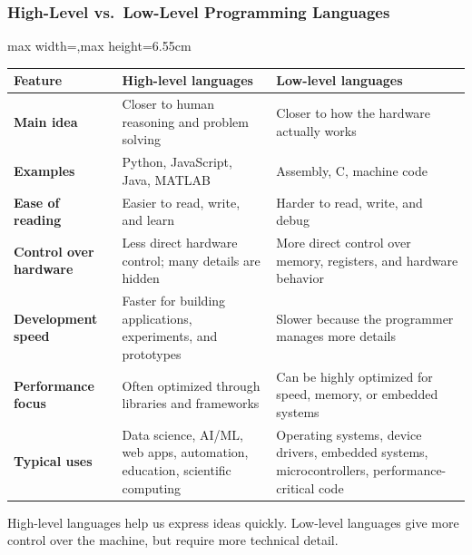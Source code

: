\documentclass[aspectratio=169,10pt]{beamer}
\begin{document}
\begin{frame}
\frametitle{High-Level vs.\ Low-Level Programming Languages}
\vspace{0cm}
\renewcommand{\arraystretch}{1.18}
\scriptsize
\begin{adjustbox}{max width=\textwidth,max height=6.55cm}
\begin{tabularx}{\textwidth}{>{\bfseries}p{2.55cm} X X}
\toprule
Feature & High-level languages & Low-level languages \\
\midrule
Main idea & Closer to human reasoning and problem solving & Closer to how the hardware actually works \\
Examples & Python, JavaScript, Java, MATLAB & Assembly, C, machine code \\
Ease of reading & Easier to read, write, and learn & Harder to read, write, and debug \\
Control over hardware & Less direct hardware control; many details are hidden & More direct control over memory, registers, and hardware behavior \\
Development speed & Faster for building applications, experiments, and prototypes & Slower because the programmer manages more details \\
Performance focus & Often optimized through libraries and frameworks & Can be highly optimized for speed, memory, or embedded systems \\
Typical uses & Data science, AI/ML, web apps, automation, education, scientific computing & Operating systems, device drivers, embedded systems, microcontrollers, performance-critical code \\
\bottomrule
\end{tabularx}
\end{adjustbox}

\vspace{0.12cm}
\begin{tcolorbox}[lecturebox,title=Remember,top=1mm,bottom=1mm]
\small High-level languages help us express ideas quickly. Low-level languages give more control over the machine, but require more technical detail.
\end{tcolorbox}
\end{frame}
\end{document}
